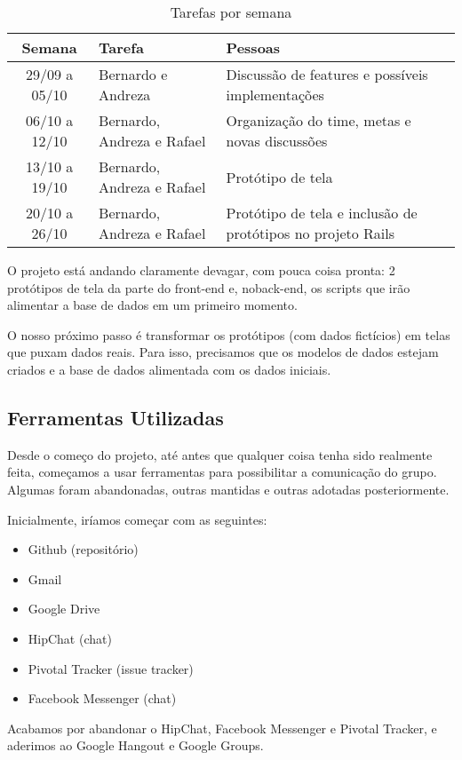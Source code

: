 \documentclass{acm_proc_article-sp}
\begin{document}
\begin{table}[h]
  \caption{Tarefas por semana}
  \begin{tabular}{|cp{3cm}p{3cm}|}
    \hline
    Semana&Tarefa&Pessoas\\
    \hline
    29/09 a 05/10&Bernardo e Andreza&Discussão de features e possíveis implementações\\
    06/10 a 12/10&Bernardo, Andreza e Rafael&Organização do time, metas e novas discussões\\
    13/10 a 19/10&Bernardo, Andreza e Rafael&Protótipo de tela\\
    20/10 a 26/10&Bernardo, Andreza e Rafael&Protótipo de tela e inclusão de protótipos no projeto Rails\\
    \hline
  \end{tabular}
\end{table}

O projeto está andando claramente devagar, com pouca coisa pronta: 2 protótipos de tela da parte do front-end e,
noback-end, os scripts que irão alimentar a base de dados em um primeiro momento.

O nosso próximo passo é transformar os protótipos (com dados fictícios) em telas que puxam dados reais.
Para isso, precisamos que os modelos de dados estejam criados e a base de dados alimentada com os dados iniciais.

\subsection{Ferramentas Utilizadas}

Desde o começo do projeto, até antes que qualquer coisa tenha sido realmente feita, começamos a usar ferramentas para possibilitar
a comunicação do grupo. Algumas foram abandonadas, outras mantidas e outras adotadas posteriormente.

Inicialmente, iríamos começar com as seguintes:

\begin{itemize}
  \item Github (repositório)
  \item Gmail
  \item Google Drive
  \item HipChat (chat)
  \item Pivotal Tracker (issue tracker)
  \item Facebook Messenger (chat)
\end{itemize}

Acabamos por abandonar o HipChat, Facebook Messenger e Pivotal Tracker, e aderimos ao Google Hangout e Google Groups.
\end{document}
